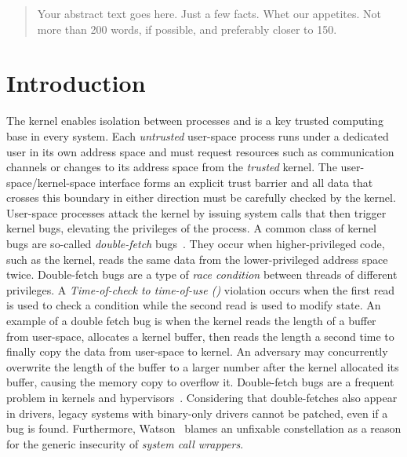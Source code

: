 \documentclass[letterpaper,twocolumn,10pt, anonymous]{article}
\begin{document}
\maketitle

\begin{abstract}
Your abstract text goes here. Just a few facts. Whet our appetites.
Not more than 200 words, if possible, and preferably closer to 150.
\end{abstract}

\section{Introduction}

The kernel enables isolation between processes and is a key trusted computing
base in every system. Each \emph{untrusted} user-space process runs under a
dedicated user in its own address space and must request resources such as
communication channels or changes to its address space from the \emph{trusted}
kernel. The user-space/kernel-space interface forms an explicit trust barrier
and all data that crosses this boundary in either direction must be carefully 
checked by the kernel.
%
User-space processes attack the kernel by issuing system calls that then trigger
kernel bugs, elevating the privileges of the process.
%
A common class of kernel bugs are so-called \emph{double-fetch}
bugs~\cite{serna08doublefetch, twizsgrakky07ring0, wilhelm2016xenpwn,
wang2018survey}. They occur when higher-privileged code, such as
the kernel, reads the same data from the lower-privileged address space twice.
%
Double-fetch bugs are a type of
\emph{race condition} between threads of different privileges. A
\emph{Time-of-check to time-of-use (\tocttou)} violation occurs when the first
read is used to check a condition while the second read is used to modify
state.
%
An example of a double fetch bug is when the kernel reads the length of a buffer
from user-space, allocates a kernel buffer, then reads the length a second time
to finally copy the data from user-space to kernel. An adversary may concurrently
overwrite the length of the buffer to a larger number after the kernel allocated
its buffer, causing the memory copy to overflow it.
%
Double-fetch bugs are a frequent problem in kernels and
hypervisors~\cite{cve201812633, cve202012652, cve20131332, cve201920610,
cve20158550, cve201610439, cve201610435, cve201610433, cve20195519,
cve20168438}. Considering that double-fetches also appear in drivers, legacy
systems with binary-only drivers cannot be patched, even if a bug is found.
Furthermore, Watson~\cite{watson2007exploiting} blames an unfixable \tocttou
constellation as a reason for the generic insecurity of \emph{system call
wrappers}.
\end{document}
